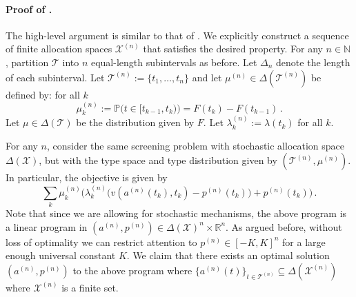 \documentclass[12pt,letterpaper]{article}
\newenvironment{original}{\color{black}\noindent}{}
\theoremstyle{plain}
\theoremstyle{definition}
\theoremstyle{remark}
\renewcommand{\P}{\mathds{P}}
\newcommand{\R}{\mathds{R}}
\newcommand{\N}{\mathds{N}}
\renewcommand{\1}{\mathds{1}}
\newcommand{\X}{\mathcal{X}}
\theoremstyle{definition}
\begin{document}
\begin{original}
\paragraph{Proof of .}\hspace{-2mm}The high-level argument is similar to that of . We explicitly construct a sequence of finite allocation spaces $\X^{(n)}$ that satisfies the desired property. For any $n \in \N$, partition $\mathcal{T}$ into $n$  equal-length subintervals as before. Let $\Delta_n$ denote the length of each subinterval. Let $\mathcal{T}^{(n)} := \{t_1,\dots,t_n\}$ and let $\mu^{(n)} \in \Delta(\mathcal{T}^{(n)})$ be defined by: for all $k$
\[\mu^{(n)}_k := \P\big(t \in [t_{k-1}, t_{k}) \big)=F(t_{k})-F(t_{k-1})\,.\]
Let $\mu \in \Delta(\mathcal{T})$ be the distribution given by $F$.  Let $\lambda_k^{(n)}:=\lambda(t_k)$ for all $k$.

For any $n$, consider the same screening problem with stochastic allocation space $\Delta(\X)$, but with the type space and type distribution given by $(\mathcal{T}^{(n)}, \mu^{(n)})$. In particular, the objective is given by
\[\sum_k \mu^{(n)}_k  \Big(\lambda^{(n)}_k\big(v(a^{(n)}(t_k),t_k) -p^{(n)}(t_k)\big) + p^{(n)}(t_k)\Big)\,. \]
Note that since we are allowing for stochastic mechanisms, the above program is a linear program in $(a^{(n)},  p^{(n)}) \in \Delta(\X)^n \times \R^n$. As argued before, without loss of optimality we can restrict attention to $p^{(n)} \in [-K, K]^{n}$ for a large enough universal constant $K$. We claim that there exists an optimal solution $(a^{(n)}, p^{(n)})$ to the above program where $\{a^{(n)}(t)\}_{t \in \mathcal{T}^{(n)}} \subseteq \Delta(\X^{(n)})$ where $\X^{(n)}$ is a finite set.


\end{original}
\end{document}
